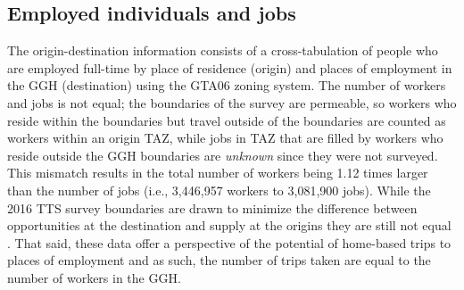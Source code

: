 \documentclass[Royal,times,sageh]{sagej}
\begin{document}
\hypertarget{employed-individuals-and-jobs}{%
\subsection{Employed individuals and
jobs}\label{employed-individuals-and-jobs}}

The origin-destination information consists of a cross-tabulation of
people who are employed full-time by place of residence (origin) and
places of employment in the GGH (destination) using the GTA06 zoning
system. The number of workers and jobs is not equal; the boundaries of
the survey are permeable, so workers who reside within the boundaries
but travel outside of the boundaries are counted as workers within an
origin TAZ, while jobs in TAZ that are filled by workers who reside
outside the GGH boundaries are \emph{unknown} since they were not
surveyed. This mismatch results in the total number of workers being
1.12 times larger than the number of jobs (i.e., 3,446,957 workers to
3,081,900 jobs). While the 2016 TTS survey boundaries are drawn to
minimize the difference between opportunities at the destination and
supply at the origins they are still not equal . That said, these data
offer a perspective of the potential of home-based trips to places of
employment and as such, the number of trips taken are equal to the
number of workers in the GGH.
\end{document}
